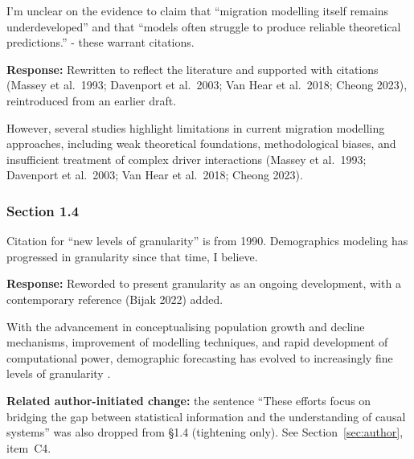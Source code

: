 \documentclass[11pt,a4paper]{article}
\begin{document}
\vspace{0.3cm}
\begin{reviewbox}
I'm unclear on the evidence to claim that ``migration modelling itself remains underdeveloped'' and that ``models often struggle to produce reliable theoretical predictions.'' - these warrant citations.
\end{reviewbox}

\textbf{Response:} Rewritten to reflect the literature and supported with citations (Massey et al.\ 1993;
Davenport et al.\ 2003; Van Hear et al.\ 2018; Cheong 2023), reintroduced from an earlier draft.

\vspace{0.3cm}
\begin{updatebox}
However, several studies highlight limitations in current migration modelling approaches, including weak theoretical
foundations, methodological biases, and insufficient treatment of complex driver interactions (Massey et al.\ 1993;
Davenport et al.\ 2003; Van Hear et al.\ 2018; Cheong 2023).
\end{updatebox}

\subsubsection*{Section 1.4}

\begin{reviewbox}
Citation for ``new levels of granularity'' is from 1990. Demographics modeling has progressed in granularity since that time, I believe.
\end{reviewbox}

\textbf{Response:} Reworded to present granularity as an ongoing development, with a contemporary reference
(Bijak 2022) added.

\vspace{0.3cm}
\begin{updatebox}
With the advancement in conceptualising population growth and decline mechanisms, improvement of modelling techniques, and
rapid development of computational power, demographic forecasting has evolved to increasingly fine levels of granularity
\citep{106-willekens1990demographic, bijak2022}.
\end{updatebox}

\vspace{0.2cm}
\begin{authorbox}
\textbf{Related author-initiated change:} the sentence ``These efforts focus on bridging the gap between statistical
information and the understanding of causal systems'' was also dropped from §1.4 (tightening only). See
Section~\ref{sec:author}, item~C4.
\end{authorbox}
\end{document}
